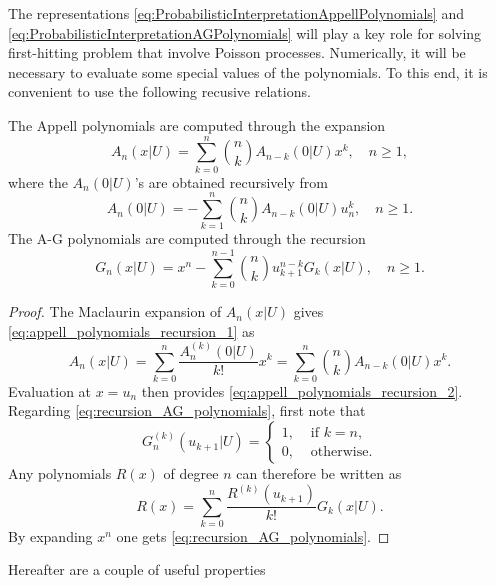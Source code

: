 The representations \eqref{eq:ProbabilisticInterpretationAppellPolynomials} and \eqref{eq:ProbabilisticInterpretationAGPolynomials} will play a key role for solving first-hitting problem that involve Poisson processes. Numerically, it will be necessary to evaluate some special values of the polynomials. To this end, it is convenient to use the following recusive relations. 
\begin{prop} 
The Appell polynomials are computed through the expansion
\begin{equation}\label{eq:appell_polynomials_recursion_1}
A_{n}(x|U)=\sum_{k=0}^{n}\binom{n}{k}A_{n-k}(0|U)x^{k}, \quad n\geq 1,
\end{equation}
where the $A_{n}(0|U)$'s are obtained recursively from 
\begin{equation}\label{eq:appell_polynomials_recursion_2}
A_{n}(0|U)=-\sum_{k=1}^{n} \binom{n}{k} A_{n-k}(0|U)u_{n}^{k}, \quad n\geq1.
\end{equation}
The A-G polynomials are computed through the recursion
\begin{equation}\label{eq:recursion_AG_polynomials}
G_{n}(x|U)=x^{n}-\sum_{k=0}^{n-1} \binom{n}{k} u_{k+1}^{n-k} G_{k}(x|U), \quad n\geq 1.
\end{equation}
\end{prop}
\begin{proof}
The Maclaurin expansion of $A_n(x|U)$ gives \eqref{eq:appell_polynomials_recursion_1} as
$$
A_n(x|U) = \sum_{k = 0}^n\frac{A_n^{(k)}(0|U)}{k!}x^k = \sum_{k = 0}^n\binom{n}{k}A_{n-k}(0|U)x^k.
$$
Evaluation at $x = u_n$ then provides \eqref{eq:appell_polynomials_recursion_2}. Regarding \eqref{eq:recursion_AG_polynomials}, first note that 
$$
G_n^{(k)}(u_{k+1}|U) = \begin{cases}
1,&\text{ if }k = n,\\
0,&\text{ otherwise.}
\end{cases}
$$
Any polynomials $R(x)$ of degree $n$ can therefore be written as 
$$
R(x)=\sum_{k = 0}^n\frac{R^{(k)}(u_{k+1})}{k!}G_k(x|U).
$$
By expanding $x^n$ one gets \eqref{eq:recursion_AG_polynomials}.
\end{proof}
Hereafter are a couple of useful properties
